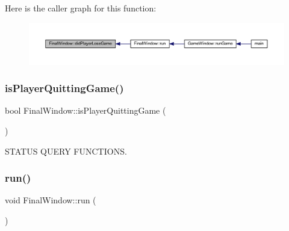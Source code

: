 Here is the caller graph for this function\+:\nopagebreak
\begin{figure}[H]
\begin{center}
\leavevmode
\includegraphics[width=350pt]{class_final_window_a793b0fa86eac2eef3256d9d2f1f3711b_icgraph}
\end{center}
\end{figure}
\mbox{\label{class_final_window_aa719a7ffb084df7f00a72fdb0d843c38}} 
\subsubsection{\texorpdfstring{is\+Player\+Quitting\+Game()}{isPlayerQuittingGame()}}
{\footnotesize\ttfamily bool Final\+Window\+::is\+Player\+Quitting\+Game (\begin{DoxyParamCaption}{ }\end{DoxyParamCaption})}



S\+T\+A\+T\+US Q\+U\+E\+RY F\+U\+N\+C\+T\+I\+O\+NS. 

\mbox{\label{class_final_window_ad0ff2789d7ab310a4b70e393f602deff}} 
\subsubsection{\texorpdfstring{run()}{run()}}
{\footnotesize\ttfamily void Final\+Window\+::run (\begin{DoxyParamCaption}{ }\end{DoxyParamCaption})}

